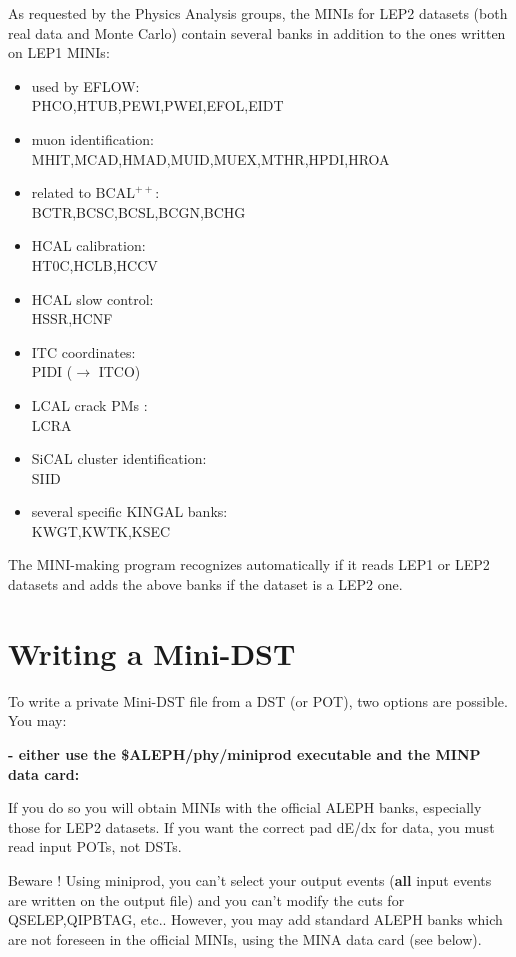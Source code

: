 As requested by the Physics Analysis groups, the MINIs for LEP2 datasets (both real data and Monte Carlo)
 contain several banks in addition to the ones written on LEP1 MINIs: 
\begin{itemize}
\item used by EFLOW:\\
  PHCO,HTUB,PEWI,PWEI,EFOL,EIDT
\item muon identification:\\
  MHIT,MCAD,HMAD,MUID,MUEX,MTHR,HPDI,HROA
\item related to ${\mathrm{BCAL^{++}}}$:\\
  BCTR,BCSC,BCSL,BCGN,BCHG
\item HCAL calibration:\\
  HT0C,HCLB,HCCV
\item HCAL slow control:\\
  HSSR,HCNF
\item ITC coordinates:\\
  PIDI ($\rightarrow$ ITCO)
\item LCAL crack PMs :\\
  LCRA
\item SiCAL cluster identification:\\
  SIID


\item several specific KINGAL banks:\\
  KWGT,KWTK,KSEC      


\end{itemize}
 
 The MINI-making program recognizes automatically if it reads LEP1 or LEP2 datasets and adds the above banks 
 if the dataset is a LEP2 one.

\par
\section{\label{sec-wtm}Writing a Mini-DST}
\par
To write a private Mini-DST file from a DST (or POT), two options are possible. You may:


{\bf - either use the \$ALEPH/phy/miniprod executable and the MINP data card:}

If you do so you will obtain MINIs with the official ALEPH banks, especially those for LEP2 datasets.
If you want the correct pad dE/dx for data, you must read input POTs, not DSTs. 

Beware ! Using miniprod, you can't select your output events ({\bf all} input events are written on the 
output file) and you can't modify the cuts for QSELEP,QIPBTAG, etc.. However, you may add standard ALEPH banks which are
not foreseen in the official MINIs, using the MINA data card (see below).

